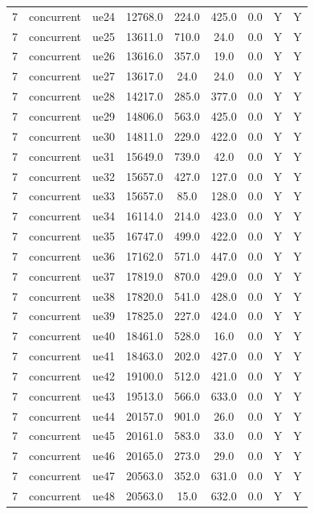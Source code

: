 \begin{table}[ht]
\begin{tabular}{|c|c|c|c|c|c|c|c|c|}
7 & concurrent & ue24 & 12768.0 & 224.0 & 425.0 & 0.0 & Y & Y \\
7 & concurrent & ue25 & 13611.0 & 710.0 & 24.0 & 0.0 & Y & Y \\
7 & concurrent & ue26 & 13616.0 & 357.0 & 19.0 & 0.0 & Y & Y \\
7 & concurrent & ue27 & 13617.0 & 24.0 & 24.0 & 0.0 & Y & Y \\
7 & concurrent & ue28 & 14217.0 & 285.0 & 377.0 & 0.0 & Y & Y \\
7 & concurrent & ue29 & 14806.0 & 563.0 & 425.0 & 0.0 & Y & Y \\
7 & concurrent & ue30 & 14811.0 & 229.0 & 422.0 & 0.0 & Y & Y \\
7 & concurrent & ue31 & 15649.0 & 739.0 & 42.0 & 0.0 & Y & Y \\
7 & concurrent & ue32 & 15657.0 & 427.0 & 127.0 & 0.0 & Y & Y \\
7 & concurrent & ue33 & 15657.0 & 85.0 & 128.0 & 0.0 & Y & Y \\
7 & concurrent & ue34 & 16114.0 & 214.0 & 423.0 & 0.0 & Y & Y \\
7 & concurrent & ue35 & 16747.0 & 499.0 & 422.0 & 0.0 & Y & Y \\
7 & concurrent & ue36 & 17162.0 & 571.0 & 447.0 & 0.0 & Y & Y \\
7 & concurrent & ue37 & 17819.0 & 870.0 & 429.0 & 0.0 & Y & Y \\
7 & concurrent & ue38 & 17820.0 & 541.0 & 428.0 & 0.0 & Y & Y \\
7 & concurrent & ue39 & 17825.0 & 227.0 & 424.0 & 0.0 & Y & Y \\
7 & concurrent & ue40 & 18461.0 & 528.0 & 16.0 & 0.0 & Y & Y \\
7 & concurrent & ue41 & 18463.0 & 202.0 & 427.0 & 0.0 & Y & Y \\
7 & concurrent & ue42 & 19100.0 & 512.0 & 421.0 & 0.0 & Y & Y \\
7 & concurrent & ue43 & 19513.0 & 566.0 & 633.0 & 0.0 & Y & Y \\
7 & concurrent & ue44 & 20157.0 & 901.0 & 26.0 & 0.0 & Y & Y \\
7 & concurrent & ue45 & 20161.0 & 583.0 & 33.0 & 0.0 & Y & Y \\
7 & concurrent & ue46 & 20165.0 & 273.0 & 29.0 & 0.0 & Y & Y \\
7 & concurrent & ue47 & 20563.0 & 352.0 & 631.0 & 0.0 & Y & Y \\
7 & concurrent & ue48 & 20563.0 & 15.0 & 632.0 & 0.0 & Y & Y \\

\end{tabular}
\end{table}
